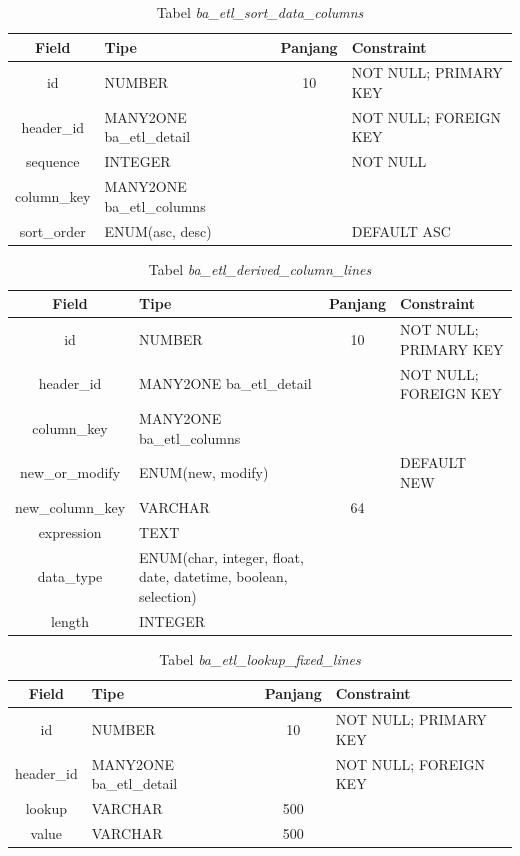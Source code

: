 \begin{table}[H]
	\centering
		\caption{Tabel \textit{ba\_etl\_sort\_data\_columns}}
		\begin{tabular}{ | c | p{4cm} | c | p{4cm} |}
			\hline
				Field & Tipe & Panjang & Constraint \\ \hline \hline
			id & NUMBER & 10 & NOT NULL; PRIMARY KEY  \\ \hline
			header\_id & MANY2ONE ba\_etl\_detail & & NOT NULL; FOREIGN KEY  \\ \hline 
			sequence & INTEGER &  & NOT NULL  \\ \hline 
			column\_key & MANY2ONE ba\_etl\_columns &  &  \\ \hline 
		sort\_order & ENUM(asc, desc) &  & DEFAULT ASC  \\ \hline
		\end{tabular}
\end{table}

\begin{table}[H]
	\centering
		\caption{Tabel \textit{ba\_etl\_derived\_column\_lines}}
		\begin{tabular}{ | c | p{4cm} | c | p{4cm} |}
			\hline
				Field & Tipe & Panjang & Constraint \\ \hline \hline
			id & NUMBER & 10 & NOT NULL; PRIMARY KEY  \\ \hline
			header\_id & MANY2ONE ba\_etl\_detail & & NOT NULL; FOREIGN KEY  \\ \hline 	
			column\_key & MANY2ONE ba\_etl\_columns &  &   \\ \hline
			new\_or\_modify  & ENUM(new, modify) &  & DEFAULT NEW\\ \hline
			new\_column\_key & VARCHAR & 64 &  \\ \hline 
		expression & TEXT &  &  \\ \hline
		data\_type & ENUM(char, integer, float, date, datetime, boolean, selection) & &  \\ \hline
		length & INTEGER &   &  \\ \hline
		\end{tabular}
\end{table}

\begin{table}[H]
	\centering
		\caption{Tabel \textit{ba\_etl\_lookup\_fixed\_lines}}
		\begin{tabular}{ | c | p{4cm} | c | p{4cm} |}
			\hline
				Field & Tipe & Panjang & Constraint \\ \hline \hline
			id & NUMBER & 10 & NOT NULL; PRIMARY KEY  \\ \hline
			header\_id & MANY2ONE ba\_etl\_detail & & NOT NULL; FOREIGN KEY  \\ \hline 
			lookup & VARCHAR & 500  &  \\ \hline 
			value & VARCHAR & 500  &  \\ \hline 
		\end{tabular}
\end{table}

